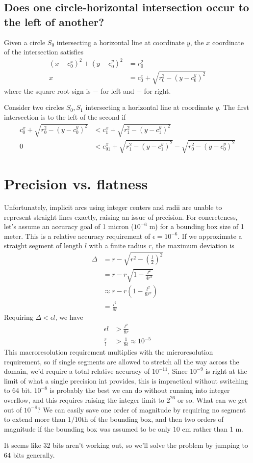 \documentclass[11pt]{article}
\begin{document}
\subsection{Does one circle-horizontal intersection occur to the left of another?}

Given a circle $S_0$ intersecting a horizontal line at coordinate $y$, the $x$ coordinate of the intersection satisfies
\begin{align*}
(x-c_0^x)^2 + (y-c_0^y)^2 &= r_0^2 \\
x &= c_0^x + \sqrt{r_0^2 - (y-c_0^y)^2}
\end{align*}
where the square root sign is $-$ for left and $+$ for right.

Consider two circles $S_0, S_1$ intersecting a horizontal line at coordinate $y$.  The first intersection is to the left of the second if
\begin{align*}
c_0^x + \sqrt{r_0^2 - (y-c_0^y)^2} &< c_1^x + \sqrt{r_1^2 - (y-c_1^y)^2} \\
0 &< c_{01}^x + \sqrt{r_1^2 - (y-c_1^y)^2} - \sqrt{r_0^2 - (y-c_0^y)^2}
\end{align*}

\section{Precision vs. flatness}

Unfortunately, implicit arcs using integer centers and radii are unable to represent straight lines exactly, raising an issue of precision.
For concreteness, let's assume an accuracy goal of 1 micron ($10^{-6}$ m) for a bounding box size of 1 meter.  This is a relative accuracy
requirement of $\epsilon = 10^{-6}$.  If we approximate a straight segment of length $l$ with a finite radius $r$, the maximum deviation is
\begin{align*}
\Delta &= r - \sqrt{r^2 - \left(\frac{l}{2}\right)^2} \\
       &= r - r \sqrt{1 - \frac{l^2}{4 r^2}} \\
       &\approx r - r \left(1 - \frac{l^2}{8 r^2} \right) \\
       &= \frac{l^2}{8 r}
\end{align*}
Requiring $\Delta < \epsilon l$, we have
\begin{align*}
\epsilon l &> \frac{l^2}{8 r} \\
\frac{r}{l} &> \frac{1}{8 \epsilon} \approx 10^{-5}
\end{align*}
This macroresolution requirement multiplies with the microresolution requirement, so if single segments are allowed to stretch all the way
across the domain, we'd require a total relative accuracy of $10^{-11}$,  Since $10^{-9}$ is right at the limit of what a single precision
int provides, this is impractical without switching to 64 bit.  $10^{-8}$ is probably the best we can do without running into integer overflow,
and this requires raising the integer limit to $2^{26}$ or so.  What can we get out of $10^{-8}$?  We can easily save one order of magnitude by
requiring no segment to extend more than $1/10$th of the bounding box, and then two orders of magnitude if the bounding box was assumed to be
only $10$ cm rather than 1 m.

It seems like 32 bits aren't working out, so we'll solve the problem by jumping to 64 bits generally.
\end{document}
